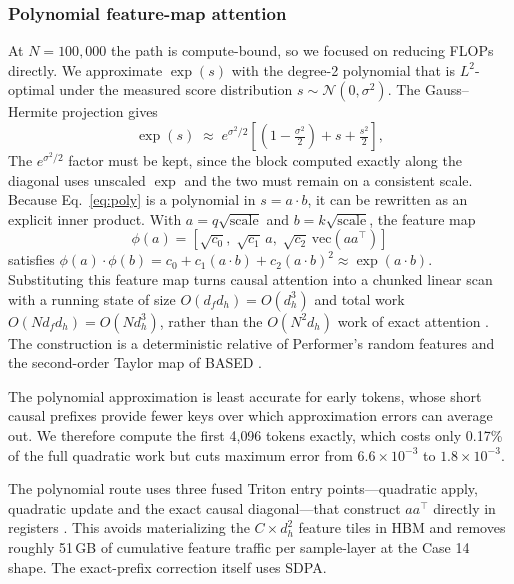 \documentclass[10pt,conference,compsoc]{IEEEtran}
\begin{document}
\subsubsection{Polynomial feature-map attention}
At $N{=}100{,}000$ the path is compute-bound, so we focused on reducing FLOPs directly. We approximate $\exp(s)$ with the degree-2 polynomial that is $L^2$-optimal under the measured score distribution $s \sim \mathcal{N}(0,\sigma^2)$. The Gauss--Hermite projection gives
\begin{equation}
\exp(s) \;\approx\; e^{\sigma^{2}/2}\!\left[\left(1 - \tfrac{\sigma^{2}}{2}\right) + s + \tfrac{s^{2}}{2}\right],
\label{eq:poly}
\end{equation}
The $e^{\sigma^2/2}$ factor must be kept, since the block computed exactly along the diagonal uses unscaled $\exp$ and the two must remain on a consistent scale. Because Eq.~\ref{eq:poly} is a polynomial in $s = a \cdot b$, it can be rewritten as an explicit inner product. With $a = q\sqrt{\text{scale}}$ and $b = k\sqrt{\text{scale}}$, the feature map
\begin{equation*}
\phi(a) = \left[\sqrt{c_0},\; \sqrt{c_1}\,a,\; \sqrt{c_2}\,\mathrm{vec}(a a^{\top})\right]
\end{equation*}
satisfies $\phi(a)\!\cdot\!\phi(b) = c_0 + c_1(a\!\cdot\!b) + c_2 (a\!\cdot\!b)^2 \approx \exp(a \cdot b)$. Substituting this feature map turns causal attention into a chunked linear scan with a running state of size $O(d_f d_h)=O(d_h^3)$ and total work $O(N d_f d_h)=O(N d_h^3)$, rather than the $O(N^2 d_h)$ work of exact attention \cite{katharopoulos}. The construction is a deterministic relative of Performer's random features \cite{performer} and the second-order Taylor map of BASED \cite{based}.

The polynomial approximation is least accurate for early tokens, whose short causal prefixes provide fewer keys over which approximation errors can average out. We therefore compute the first 4{,}096 tokens exactly, which costs only 0.17\% of the full quadratic work but cuts maximum error from $6.6\times10^{-3}$ to $1.8\times10^{-3}$.

The polynomial route uses three fused Triton entry points---quadratic apply, quadratic update and the exact causal diagonal---that construct $a a^{\top}$ directly in registers \cite{triton}. This avoids materializing the $C \times d_h^2$ feature tiles in HBM and removes roughly 51\,GB of cumulative feature traffic per sample-layer at the Case 14 shape. The exact-prefix correction itself uses SDPA.
\end{document}
